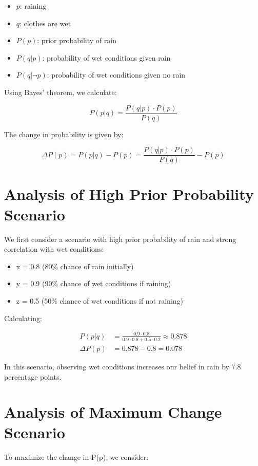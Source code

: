 \documentclass[10pt,letterpaper]{article}
\begin{document}
\begin{itemize}
    \item $p$: raining
    \item $q$: clothes are wet
    \item $P(p)$: prior probability of rain
    \item $P(q|p)$: probability of wet conditions given rain
    \item $P(q|\neg p)$: probability of wet conditions given no rain
\end{itemize}

Using Bayes' theorem, we calculate:

\begin{equation}
    P(p|q) = \frac{P(q|p) \cdot P(p)}{P(q)}
\end{equation}

The change in probability is given by:

\begin{equation}
    \Delta P(p) = P(p|q) - P(p) = \frac{P(q|p) \cdot P(p)}{P(q)} - P(p)
\end{equation}

\section{Analysis of High Prior Probability Scenario}
We first consider a scenario with high prior probability of rain and strong correlation with wet conditions:

\begin{itemize}
    \item x = 0.8 (80\% chance of rain initially)
    \item y = 0.9 (90\% chance of wet conditions if raining)
    \item z = 0.5 (50\% chance of wet conditions if not raining)
\end{itemize}

Calculating:

\begin{align*}
    P(p|q) &= \frac{0.9 \cdot 0.8}{0.9 \cdot 0.8 + 0.5 \cdot 0.2} \approx 0.878 \\
    \Delta P(p) &= 0.878 - 0.8 = 0.078
\end{align*}

In this scenario, observing wet conditions increases our belief in rain by 7.8 percentage points.

\section{Analysis of Maximum Change Scenario}
To maximize the change in P(p), we consider:
\end{document}
